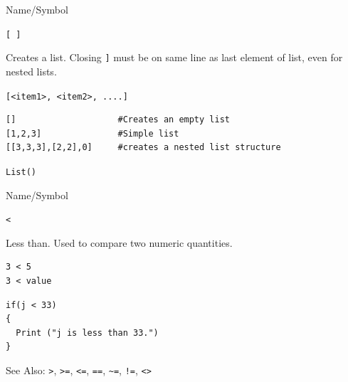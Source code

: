 \begin{desc}{Name/Symbol}

\item[Name/Symbol] \verb+[ ]+                 

\item[Description]  Creates a list. Closing \verb+]+ must be on
 	      same line as last element of list, even
	      for nested lists.

\item[Usage]       \verb+[<item1>, <item2>, ....]+
            

\item[Example]
\begin{verbatim}
[]                    #Creates an empty list
[1,2,3]               #Simple list
[[3,3,3],[2,2],0]     #creates a nested list structure
\end{verbatim}


\item[See Also]     \texttt{List()}
\end{desc}



\begin{desc}{Name/Symbol}

\item[Name/Symbol] 	\verb+<+ 

\item[Description] 	Less than.  Used to compare two numeric quantities.

\item[Usage]
\begin{verbatim}
3 < 5
3 < value
\end{verbatim}
             
\item[Example]
\begin{verbatim}
if(j < 33)
{
  Print ("j is less than 33.")
}
\end{verbatim}

See Also:     	\verb+>+, \verb+>=+, \verb+<=+, \verb+==+, \verb+~=+, \verb+!=+, \verb+<>+

\end{desc}





